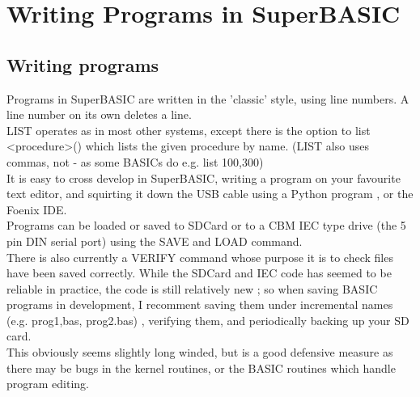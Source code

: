 \chapter{Writing Programs in SuperBASIC}

\section {Writing programs}
Programs in SuperBASIC are written in the 'classic' style, using line numbers. A line number on its own deletes a line.\\

LIST operates as in most other systems, except there is the option to list <procedure>() which lists the given procedure by name. (LIST also uses commas, not - as some BASICs do e.g. list 100,300)\\

It is easy to cross develop in SuperBASIC, writing a program on your favourite text editor, and squirting it down the USB cable using a Python program , or the Foenix IDE.\\

Programs can be loaded or saved to SDCard or to a CBM IEC type drive (the 5 pin DIN serial port) using the SAVE and LOAD command.\\

There is also currently a VERIFY command whose purpose it is to check files have been saved correctly. While the SDCard and IEC code has seemed to be reliable in practice, the code is still relatively new ; so when saving BASIC programs in development, I recomment saving them under incremental names (e.g. prog1,bas, prog2.bas) , verifying them, and periodically backing up your SD card.\\

This obviously seems slightly long winded, but is a good defensive measure as there may be bugs in the kernel routines, or the BASIC routines which handle program editing. 
